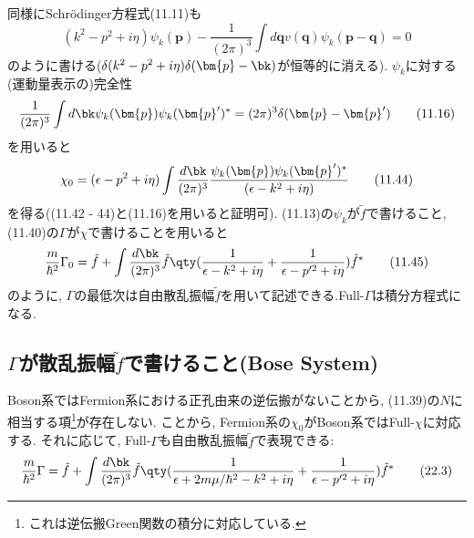 \documentclass[10.5pt,a4paper]{jreport}
\begin{document}
同様にSchr\"odinger方程式(11.11)も
\begin{equation}
  (k^2 - p^2 + i\eta)\psi_k(\bm{p}) - \frac{1}{(2\pi)^3}\int d\bm{q} v(\bm{q})\psi_k(\bm{p} - \bm{q}) = 0\tag{11.43}
\end{equation}
のように書ける($\delta(k^2 - p^2 + i\eta)\delta(\bm{p} - \bk)$が恒等的に消える). $\psi_k$に対する(運動量表示の)完全性
\begin{equation}
  \frac{1}{(2\pi)^3}\int d\bk \psi_k(\bm{p})\psi_k(\bm{p}')^* = (2\pi)^3\delta(\bm{p} - \bm{p}')\tag{11.16}
\end{equation}
を用いると
\begin{equation}
  \chi_0 = (\epsilon - p^2 + i\eta)\int \frac{d\bk}{(2\pi)^3}\frac{\psi_k(\bm{p})\psi_k(\bm{p}')^*}{(\epsilon - k^2 + i\eta)}\tag{11.44}
\end{equation}
を得る((11.42 - 44)と(11.16)を用いると証明可). (11.13)の$\psi_k$が$\tilde{f}$で書けること, (11.40)の$\Gamma$が$\chi$で書けることを用いると
\begin{equation}
  \frac{m}{\hbar^2}\Gamma_0 = \tilde{f} + \int\frac{d\bk}{(2\pi)^3}\tilde{f}\qty(\frac{1}{\epsilon - k^2 + i\eta} + \frac{1}{\epsilon - p'^2 + i\eta})\tilde{f}^*\tag{11.45}
\end{equation}
のように, $\Gamma$の最低次は自由散乱振幅$\tilde{f}$を用いて記述できる.Full-$\Gamma$は積分方程式になる.
\subsection{$\Gamma$が散乱振幅$\tilde{f}$で書けること(Bose System)}
Boson系ではFermion系における正孔由来の逆伝搬がないことから, (11.39)の$N$に相当する項\footnote{これは逆伝搬Green関数の積分に対応している. }が存在しない. ことから, Fermion系の$\chi_0$がBoson系ではFull-$\chi$に対応する. それに応じて, Full-$\Gamma$も自由散乱振幅$\tilde{f}$で表現できる:
\begin{equation}
  \frac{m}{\hbar^2}\Gamma= \tilde{f} + \int\frac{d\bk}{(2\pi)^3}\tilde{f}\qty(\frac{1}{\epsilon + 2m\mu/\hbar^2 - k^2 + i\eta} + \frac{1}{\epsilon - p'^2 + i\eta})\tilde{f}^*\tag{22.3}
\end{equation}
\end{document}
